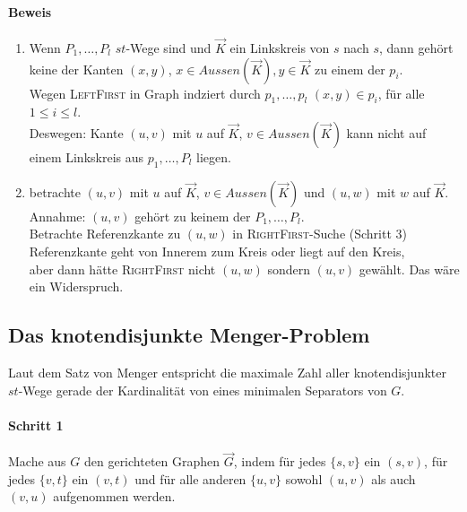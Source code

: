 \documentclass{article}
\begin{document}
\paragraph{Beweis}
\begin{enumerate}
	\item Wenn $P_1,\ldots, P_l$ $st$-Wege sind und $\overrightarrow{K}$ ein Linkskreis von $s$ nach $s$, dann gehört keine der Kanten $(x,y)$, $x \in Aussen(\overrightarrow{K}), y \in \overrightarrow{K}$ zu einem der $p_i$.\\
	Wegen \textsc{LeftFirst} in Graph indziert durch $p_1,\ldots, p_l$ $(x,y) \in p_i$, für alle $1 \leq i \leq l$.\\
	Deswegen: Kante $(u,v)$ mit $u$ auf $\overrightarrow{K}$, $v \in Aussen(\overrightarrow{K})$ kann nicht auf einem Linkskreis aus $p_1,\ldots, P_l$ liegen.
	
	\item betrachte $(u,v)$ mit $u$ auf $\overrightarrow{K}$, $v \in Aussen(\overrightarrow{K})$ und $(u,w)$ mit $w$ auf $\overrightarrow{K}$.\\
	Annahme: $(u,v)$ gehört zu keinem der $P_1, \ldots, P_l$.\\
	Betrachte Referenzkante zu $(u,w)$ in \textsc{RightFirst}-Suche (Schritt 3)\\
	Referenzkante geht von Innerem zum Kreis oder liegt auf den Kreis,\\
	aber dann hätte \textsc{RightFirst} nicht $(u,w)$ sondern $(u,v)$ gewählt. Das wäre ein Widerspruch.
\end{enumerate}


\subsection{Das knotendisjunkte Menger-Problem}
Laut dem Satz von Menger entspricht die maximale Zahl aller knotendisjunkter $st$-Wege gerade der Kardinalität von eines minimalen Separators von $G$.

\paragraph{Schritt 1}
Mache aus $G$ den gerichteten Graphen $\overrightarrow{G}$, indem für jedes $\{s, v\}$ ein $(s,v)$, für jedes $\{v,t\}$ ein $(v,t)$ und für alle anderen $\{u,v\}$ sowohl $(u,v)$ als auch $(v,u)$ aufgenommen werden.
\end{document}
